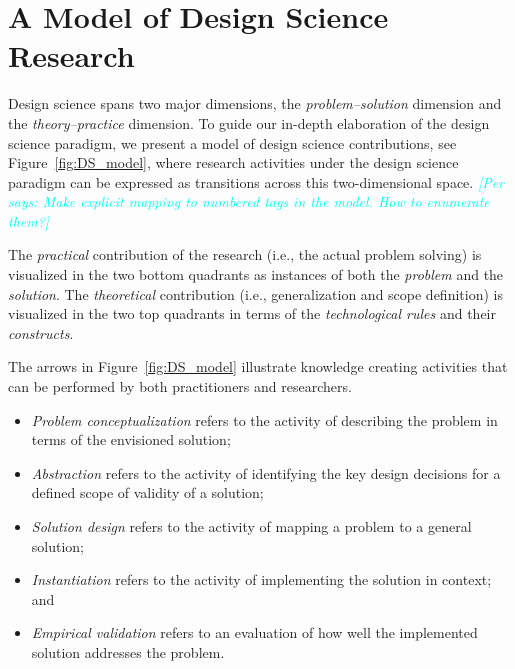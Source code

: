 \documentclass[graybox]{svmult}
\newcommand{\emelie}[1]{\textcolor{red}{{\it [Emelie says: #1]}}}
\newcommand{\per}[1]{\textcolor{cyan}{{\it [Per says: #1]}}}
\newcommand{\emelie}[1]{}
\newcommand{\per}[1]{}
\begin{document}
\section{A Model of Design Science Research}
\label{sec:DesignScienceResearch}


Design science spans two major dimensions, the \emph{problem--solution} dimension and the \emph{theory--practice} dimension. To guide our in-depth elaboration of the design science paradigm, we present a model of design science contributions, see Figure~\ref{fig:DS_model}, where research activities under the design science paradigm can be expressed as transitions across this two-dimensional space.
\per{Make explicit mapping to numbered tags in the model. How to enumerate them?}

The \emph{practical} contribution of the research (i.e., the actual problem solving) is visualized in the two bottom quadrants as instances of both the \emph{problem} and the \emph{solution}. The \emph{theoretical} contribution (i.e., generalization and scope definition) is visualized in the two top quadrants in terms of the \emph{technological rules} and their \emph{constructs}. 

The arrows in Figure~\ref{fig:DS_model} illustrate knowledge creating activities that can be performed by both practitioners and researchers. 
\begin{itemize}
\item \emph{Problem conceptualization} refers to the activity of describing the problem in terms of the envisioned solution; 
\item \emph{Abstraction} refers to the activity of identifying the key design decisions for a defined scope of validity of a solution; 
\item \emph{Solution design} refers to the activity of mapping a problem to a general solution; 
\item \emph{Instantiation} refers to the activity of implementing the solution in context; and 
\item \emph{Empirical validation} refers to an evaluation of how well the implemented solution addresses the problem.
\end{itemize}
\end{document}
